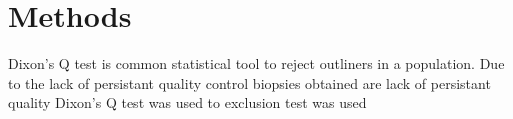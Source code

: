 \chapter{Methods}

Dixon's Q test is common statistical tool to reject outliners in a population. Due to the lack of persistant quality control  biopsies obtained are lack of persistant quality Dixon's Q test was used to   exclusion test was used 